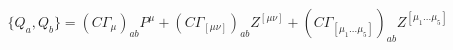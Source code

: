 \begin{equation}
\{Q_a,Q_b\}= (C\Gamma_\mu )_{ab}P^\mu +(C\Gamma_{[\mu\nu]})_{ab}
Z^{[\mu\nu]} +
(C\Gamma_{[\mu_1\dots\mu_5]})_{ab}Z^{[\mu_1\dots\mu_5]}
\label{Malg}
\end{equation}

